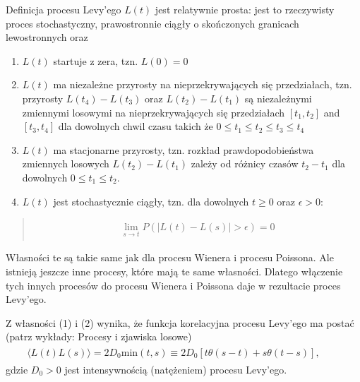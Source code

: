 \documentclass[a4paper,12pt,polish]{sphinxmanual}
\begin{document}
Definicja procesu Levy'ego $L(t)$ jest relatywnie prosta: jest to rzeczywisty proces stochastyczny, prawostronnie ciągły o skończonych granicach lewostronnych oraz
\begin{enumerate}
\item {} 
$L(t)$ startuje z zera, tzn. $L(0)=0$

\item {} 
$L(t)$ ma niezależne przyrosty na nieprzekrywających się przedziałach, tzn. przyrosty $L(t_4) -L(t_3)$ oraz $L(t_2) -L(t_1)$ są niezależnymi zmiennymi losowymi na nieprzekrywających się przedziałach $[t_1, t_2]$ and $[t_3, t_4]$ dla dowolnych chwil czasu takich że $0 \le t_1 \le t_2 \le t_3 \le t_4$

\item {} 
$L(t)$ ma stacjonarne przyrosty, tzn. rozkład prawdopodobieństwa zmiennych losowych $L(t_2) -L(t_1)$ zależy od różnicy czasów $t_2 -t_1$ dla dowolnych $0 \le t_1 \le t_2$.

\item {} 
$L(t)$ jest stochastycznie ciągły, tzn. dla dowolnych $t \ge 0$ oraz $\epsilon > 0$:

\end{enumerate}
\begin{quote}
\label{ch3/chIII021:equation-eqn49}\begin{gather}
\begin{split}\lim_{s\to t} P(|L(t) -L(s)|>\epsilon)=0\end{split}\label{ch3/chIII021-eqn49}
\end{gather}\end{quote}

Własności te są takie same jak dla procesu Wienera i procesu Poissona. Ale istnieją jeszcze inne procesy, które mają te same własności. Dlatego włączenie tych innych procesów do procesu Wienera i Poissona daje w rezultacie proces Levy'ego.

Z własności (1) i (2) wynika, że funkcja korelacyjna procesu Levy'ego ma postać (patrz wykłady: Procesy i zjawiska losowe)
\label{ch3/chIII021:equation-eqn50}\begin{gather}
\begin{split}\langle L(t) L(s) \rangle = 2D_0 \mbox{min} (t, s) \equiv 2D_0 [t \theta(s-t) + s \theta(t-s)], \qquad\end{split}\label{ch3/chIII021-eqn50}
\end{gather}
gdzie $D_0 >0$ jest intensywnością (natężeniem) procesu Levy'ego.
\end{document}
